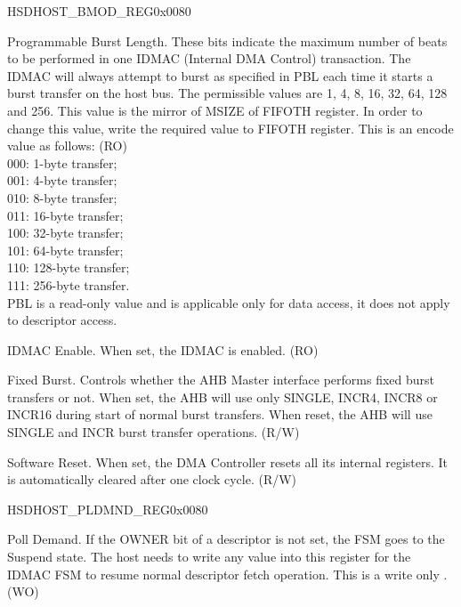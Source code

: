 \begin{register}{H}{SDHOST\_BMOD\_REG}{0x{}0080}\label{regdesc:BMODREG}
%
%
%
%
%
%
\regnewline%
\begin{regdesc}\begin{reglist}
\item [SDHOST\_BMOD\_PBL]Programmable Burst Length. These bits indicate the maximum number of beats to be performed in one IDMAC (Internal DMA Control) transaction. The IDMAC will always attempt to burst as specified in PBL each time it starts a burst transfer on the host bus. The permissible values are 1, 4, 8, 16, 32, 64, 128 and 256. This value is the mirror of MSIZE of FIFOTH register. In order to change this value, write the required value to FIFOTH register. This is an encode value as follows: (RO)\\
000: 1-byte transfer; \\
001: 4-byte transfer; \\
010: 8-byte transfer; \\
011: 16-byte transfer; \\
100: 32-byte transfer; \\
101: 64-byte transfer; \\
110: 128-byte transfer; \\
111: 256-byte transfer.\\
PBL is a read-only value and is applicable only for data access, it does not apply to descriptor access.
\item [SDHOST\_BMOD\_DE]IDMAC Enable. When set, the IDMAC is enabled. (RO)
\item [SDHOST\_BMOD\_FB]Fixed Burst. Controls whether the AHB Master interface performs fixed burst transfers or not. When set, the AHB will use only SINGLE, INCR4, INCR8 or INCR16 during start of normal burst transfers. When reset, the AHB will use SINGLE and INCR burst transfer operations. (R/W)
\item [SDHOST\_BMOD\_SWR]Software Reset. When set, the DMA Controller resets all its internal registers. It is automatically cleared after one clock cycle. (R/W)
\end{reglist}\end{regdesc}
\end{register}


\begin{register}{H}{SDHOST\_PLDMND\_REG}{0x{}0080}\label{regdesc:PLDMNDREG}
%
\regnewline%
\begin{regdesc}\begin{reglist}
\item [SDHOST\_PLDMND\_REG]Poll Demand. If the OWNER bit of a descriptor is not set, the FSM goes to the Suspend state. The host needs to write any value into this register for the IDMAC FSM to resume normal descriptor fetch operation. This is a write only . (WO)
\end{reglist}\end{regdesc}
\end{register}


